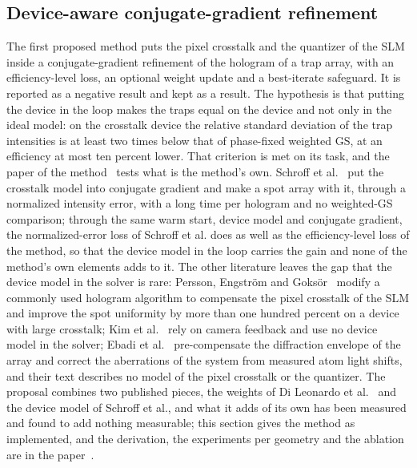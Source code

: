 
\subsection{Device-aware conjugate-gradient refinement}\label{sec:b1}

The first proposed method puts the pixel crosstalk and the quantizer of the SLM inside a conjugate-gradient refinement of the hologram of a trap array, with an efficiency-level loss, an optional weight update and a best-iterate safeguard. It is reported as a negative result and kept as a result. The hypothesis is that putting the device in the loop makes the traps equal on the device and not only in the ideal model: on the crosstalk device the relative standard deviation of the trap intensities is at least two times below that of phase-fixed weighted GS, at an efficiency at most ten percent lower. That criterion is met on its task, and the paper of the method~\cite{companion} tests what is the method's own. Schroff et al.~\cite{schroff} put the crosstalk model into conjugate gradient and make a spot array with it, through a normalized intensity error, with a long time per hologram and no weighted-GS comparison; through the same warm start, device model and conjugate gradient, the normalized-error loss of Schroff et al. does as well as the efficiency-level loss of the method, so that the device model in the loop carries the gain and none of the method's own elements adds to it. The other literature leaves the gap that the device model in the solver is rare: Persson, Engstr\"om and Goks\"or~\cite{persson} modify a commonly used hologram algorithm to compensate the pixel crosstalk of the SLM and improve the spot uniformity by more than one hundred percent on a device with large crosstalk; Kim et al.~\cite{kim2019} rely on camera feedback and use no device model in the solver; Ebadi et al.~\cite{ebadi2021} pre-compensate the diffraction envelope of the array and correct the aberrations of the system from measured atom light shifts, and their text describes no model of the pixel crosstalk or the quantizer. The proposal combines two published pieces, the weights of Di Leonardo et al.~\cite{dileonardo} and the device model of Schroff et al., and what it adds of its own has been measured and found to add nothing measurable; this section gives the method as implemented, and the derivation, the experiments per geometry and the ablation are in the paper~\cite{companion}.

